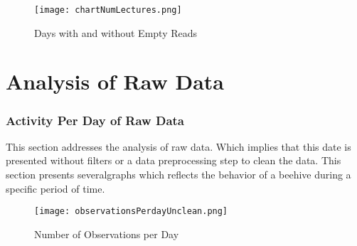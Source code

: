 \documentclass[11pt,fleqn]{book} %
\begin{document}
\begin{figure}[h!]%
\centering%
\texttt{[image: chartNumLectures.png]}%
\caption{Days with and without Empty Reads}%
\end{figure}

\chapter{Analysis of Raw Data} 
\normalsize%
\subsection*{Activity Per Day of Raw Data}%
This section addresses the analysis of raw data. Which implies that this date is presented without filters or a data preprocessing step to clean the data. This section presents severalgraphs which reflects the behavior of a beehive during a specific period of time.%


\begin{figure}[h!]%
\centering%
\texttt{[image: observationsPerdayUnclean.png]}%
\caption{Number of Observations per Day}%
\end{figure}
\end{document}
